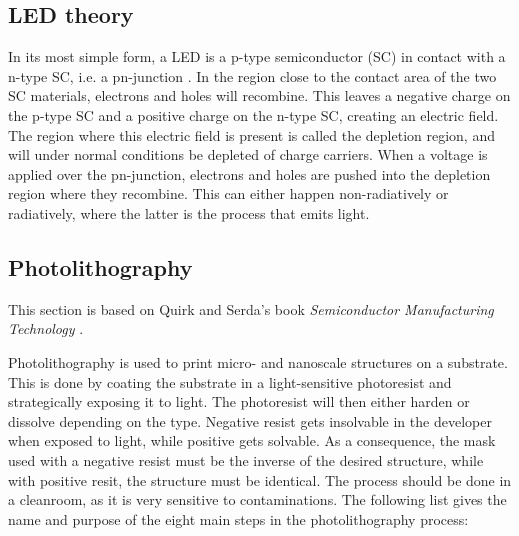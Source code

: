 
\subsection{LED theory}
\label{LEDtheory}

\noindent In its most simple form, a LED is a p-type semiconductor (SC) in contact with a n-type SC, i.e. a pn-junction \cite{streetman2015solid}.
In the region close to the contact area of the two SC materials, electrons and holes will recombine.
This leaves a negative charge on the p-type SC and a positive charge on the n-type SC, creating an electric field.
The region where this electric field is present is called the depletion region, and will under normal conditions be depleted of charge carriers.
When a voltage is applied over the pn-junction, electrons and holes are pushed into the depletion region where they recombine.
This can either happen non-radiatively or radiatively, where the latter is the process that emits light.




\subsection{Photolithography}
\label{photolithography}
\noindent This section is based on Quirk and Serda's book \textit{Semiconductor Manufacturing Technology} \cite{quirkSerda}.

Photolithography is used to print micro- and nanoscale structures on a substrate.
This is done by coating the substrate in a light-sensitive photoresist and strategically exposing it to light.
The photoresist will then either harden or dissolve depending on the type.
Negative resist gets insolvable in the developer when exposed to light, while positive gets solvable.
As a consequence, the mask used with a negative resist must be the inverse of the desired structure, while with positive resit, the structure must be identical.
The process should be done in a cleanroom, as it is very sensitive to contaminations.
The following list gives the name and purpose of the eight main steps in the photolithography process:

